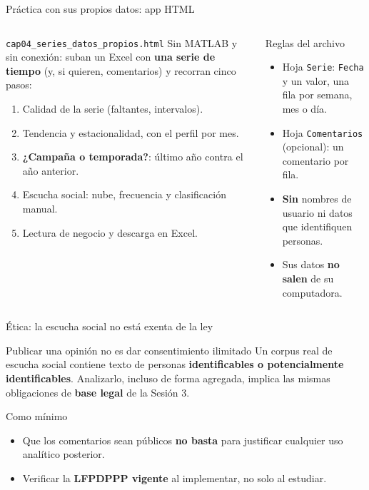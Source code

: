 \documentclass[aspectratio=169,xcolor=dvipsnames]{beamer}
\begin{document}
\begin{frame}{Práctica con sus propios datos: app HTML}
\begin{columns}[T]
  \begin{block}{\texttt{cap04\_series\_datos\_propios.html}}
    \small Sin MATLAB y sin conexión: suban un Excel con \textbf{una serie de tiempo} (y, si quieren, comentarios) y recorran cinco pasos:
    \scriptsize
    \begin{enumerate}
      \item Calidad de la serie (faltantes, intervalos).
      \item Tendencia y estacionalidad, con el perfil por mes.
      \item \textbf{¿Campaña o temporada?}: último año contra el año anterior.
      \item Escucha social: nube, frecuencia y clasificación manual.
      \item Lectura de negocio y descarga en Excel.
    \end{enumerate}
  \end{block}
  \begin{exampleblock}{Reglas del archivo}
    \scriptsize
    \begin{itemize}
      \item Hoja \texttt{Serie}: \texttt{Fecha} y un valor, una fila por semana, mes o día.
      \item Hoja \texttt{Comentarios} (opcional): un comentario por fila.
      \item \textbf{Sin} nombres de usuario ni datos que identifiquen personas.
      \item Sus datos \textbf{no salen} de su computadora.
    \end{itemize}
  \end{exampleblock}
\end{columns}
\end{frame}

\begin{frame}{Ética: la escucha social no está exenta de la ley}
\begin{alertblock}{Publicar una opinión no es dar consentimiento ilimitado}
  Un corpus real de escucha social contiene texto de personas \textbf{identificables o potencialmente identificables}. Analizarlo, incluso de forma agregada, implica las mismas obligaciones de \textbf{base legal} de la Sesión 3.
\end{alertblock}
\begin{block}{Como mínimo}
  \begin{itemize}
    \item Que los comentarios sean públicos \textbf{no basta} para justificar cualquier uso analítico posterior.
    \item Verificar la \textbf{LFPDPPP vigente} al implementar, no solo al estudiar.
  \end{itemize}
\end{block}
\end{frame}
\end{document}
